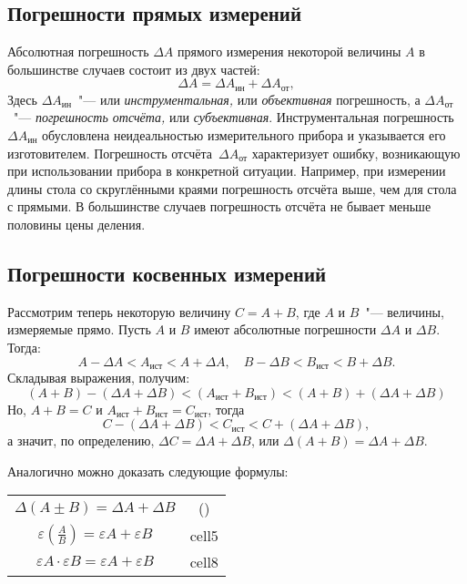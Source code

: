 \documentclass[a4paper,12pt]{article}
\begin{document}
\subsection{Погрешности прямых измерений}
Абсолютная погрешность $\Delta A$ прямого измерения некоторой величины $A$ в большинстве случаев состоит из двух частей:
\begin{equation}
	\Delta A = \Delta A_{\text{ин}} + \Delta A_{\text{от}},
\end{equation}
Здесь $\Delta A_{\text{ин}}$~"--- или \textit{инструментальная,} или \textit{объективная} погрешность, а $\Delta A_{\text{от}}$~"--- \textit{погрешность отсчёта,} или \textit{субъективная}. Инструментальная погрешность~$\Delta A_{\text{ин}}$ обусловлена неидеальностью измерительного прибора и указывается его изготовителем. Погрешность отсчёта~$\Delta A_{\text{от}}$ характеризует ошибку, возникающую при использовании прибора в конкретной ситуации. Например, при измерении длины стола со скруглёнными краями погрешность отсчёта выше, чем для стола с прямыми. В большинстве случаев погрешность отсчёта не бывает меньше половины цены деления.

\subsection{Погрешности косвенных измерений}

Рассмотрим теперь некоторую величину $C = A + B$, где $A$ и $B$~"--- величины, измеряемые прямо. Пусть $A$ и $B$ имеют абсолютные погрешности $\Delta A$ и $\Delta B$. Тогда:
\begin{equation}
	A-\Delta A < A_{\text{ист}} < A+\Delta A, \quad 
		B-\Delta B < B_{\text{ист}} < B+\Delta B.
\end{equation} 
Складывая выражения, получим:
\begin{equation}
	(A+B)-(\Delta A + \Delta B) < (A_{\text{ист}} + B_{\text{ист}}) < (A+B)+(\Delta A + \Delta B)
\end{equation}
Но, $A+B=C$ и $A_{\text{ист}}+B_{\text{ист}}=C_{\text{ист}}$, тогда
\begin{equation}
	C-(\Delta A + \Delta B) < C_{\text{ист}} < C+(\Delta A + \Delta B),
\end{equation}
а значит, по определению, $\Delta C = \Delta A + \Delta B$, или $\Delta (A+B) = \Delta A + \Delta B$.

Аналогично можно доказать следующие формулы:
\begin{center}
	\begin{tabular}{ |c|c| } 
		\hline
		$\Delta(A\pm B) = \Delta A + \Delta B$ & \varepsilon () \\ 
		$\varepsilon \left( \frac{A}{B} \right) = \varepsilon A + \varepsilon B$ & cell5 \\ 
		$\varepsilon A \cdot \varepsilon B = \varepsilon A + \varepsilon B$ & cell8 \\ 
		\hline
	\end{tabular}
\end{center}
\end{document}
